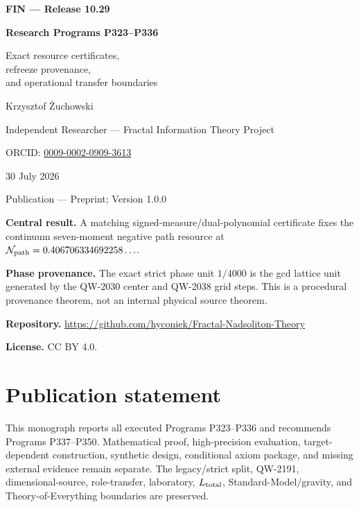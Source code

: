 \documentclass[11pt,a4paper,openany]{report}
\begin{document}
\hypersetup{pageanchor=false}
\begin{titlepage}
\centering
\vspace*{7mm}
{\Large\bfseries FIN --- Release 10.29\par}
\vspace{9mm}
{\Huge\bfseries Research Programs P323--P336\par}
\vspace{6mm}
{\Large Exact resource certificates,\\
refreeze provenance,\\
and operational transfer boundaries\par}
\vspace{13mm}
{\Large Krzysztof \.Zuchowski\par}
\vspace{2mm}
{\normalsize Independent Researcher --- Fractal Information Theory Project\par}
\vspace{2mm}
{\normalsize ORCID:
\href{https://orcid.org/0009-0002-0909-3613}{0009-0002-0909-3613}\par}
\vspace{7mm}
{\large 30 July 2026\par}
{\normalsize Publication --- Preprint; Version 1.0.0\par}
\vfill
\begin{minipage}{0.92\textwidth}
\small
\textbf{Central result.}
A matching signed-measure/dual-polynomial certificate fixes the continuum
seven-moment negative path resource at
\(\mathcal N_{\rm path}=0.406706334692258\ldots\).

\medskip
\textbf{Phase provenance.}
The exact strict phase unit \(1/4000\) is the gcd lattice unit generated by
the QW-2030 center and QW-2038 grid steps.  This is a procedural provenance
theorem, not an internal physical source theorem.

\medskip
\textbf{Repository.}
\url{https://github.com/hyconiek/Fractal-Nadsoliton-Theory}

\textbf{License.} CC BY 4.0.
\end{minipage}
\vfill
\end{titlepage}
\hypersetup{pageanchor=true}
\chapter*{Publication statement}
This monograph reports all executed Programs P323--P336 and recommends
Programs P337--P350.  Mathematical proof, high-precision evaluation,
target-dependent construction, synthetic design, conditional axiom package,
and missing external evidence remain separate.  The legacy/strict split,
QW-2191, dimensional-source, role-transfer, laboratory, \(L_{\rm total}\),
Standard-Model/gravity, and Theory-of-Everything boundaries are preserved.
\end{document}
